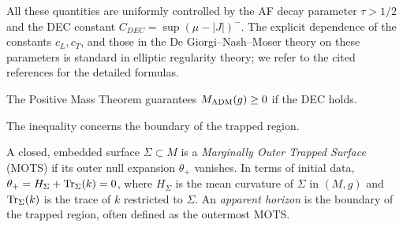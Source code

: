 \begin{proposition}
All these quantities are uniformly controlled by the AF decay parameter $\tau > 1/2$ and the DEC constant $C_{DEC} = \sup(\mu - |J|)^{-}$. The explicit dependence of the constants $c_L, c_T$, and those in the De Giorgi--Nash--Moser theory on these parameters is standard in elliptic regularity theory; we refer to the cited references for the detailed formulas.
\end{proposition}

The Positive Mass Theorem \cite{schoen1981} guarantees $M_{\mathrm{ADM}}(g) \ge 0$ if the DEC holds.

The inequality concerns the boundary of the trapped region.

\begin{definition}[MOTS]\label{def:MOTS}
A closed, embedded surface $\Sigma \subset M$ is a \emph{Marginally Outer Trapped Surface} (MOTS) if its outer null expansion $\theta_+$ vanishes. In terms of initial data, $\theta_+ = H_\Sigma + \operatorname{Tr}_\Sigma(k) = 0$, where $H_\Sigma$ is the mean curvature of $\Sigma$ in $(M,g)$ and $\operatorname{Tr}_\Sigma(k)$ is the trace of $k$ restricted to $\Sigma$. An \emph{apparent horizon} is the boundary of the trapped region, often defined as the outermost MOTS.
\end{definition}

